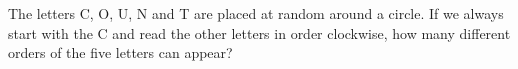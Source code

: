 The letters C, O, U, N and T are placed at random around a circle. If we always start with the C and read the other letters in order clockwise, how many different orders of the five letters can appear?
